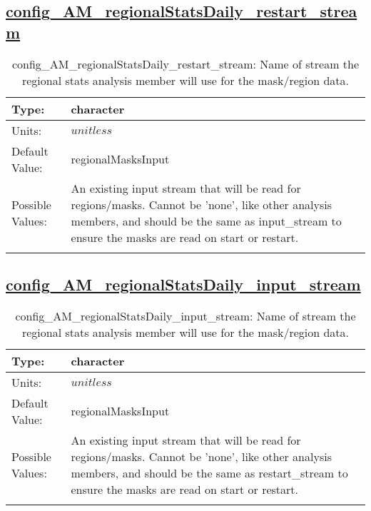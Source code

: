 \subsection[config\_AM\_regionalStatsDaily\_restart\_stream]{\hyperref[sec:nm_tab_AM_regionalStatsDaily]{config\_AM\_regionalStatsDaily\_restart\_stream}}
\label{subsec:nm_sec_config_AM_regionalStatsDaily_restart_stream}
\begin{center}
\begin{longtable}{| p{2.0in} || p{4.0in} |}
    \hline
    Type: & character \\
    \hline
    Units: & $unitless$ \\
    \hline
    Default Value: & regionalMasksInput \\
    \hline
    Possible Values: & An existing input stream that will be read for regions/masks. Cannot be 'none', like other analysis members, and should be the same as input\_stream to ensure the masks are read on start or restart. \\
    \hline
    \caption{config\_AM\_regionalStatsDaily\_restart\_stream: Name of stream the regional stats analysis member will use for the mask/region data.}
\end{longtable}
\end{center}
\subsection[config\_AM\_regionalStatsDaily\_input\_stream]{\hyperref[sec:nm_tab_AM_regionalStatsDaily]{config\_AM\_regionalStatsDaily\_input\_stream}}
\label{subsec:nm_sec_config_AM_regionalStatsDaily_input_stream}
\begin{center}
\begin{longtable}{| p{2.0in} || p{4.0in} |}
    \hline
    Type: & character \\
    \hline
    Units: & $unitless$ \\
    \hline
    Default Value: & regionalMasksInput \\
    \hline
    Possible Values: & An existing input stream that will be read for regions/masks. Cannot be 'none', like other analysis members, and should be the same as restart\_stream to ensure the masks are read on start or restart. \\
    \hline
    \caption{config\_AM\_regionalStatsDaily\_input\_stream: Name of stream the regional stats analysis member will use for the mask/region data.}
\end{longtable}
\end{center}
